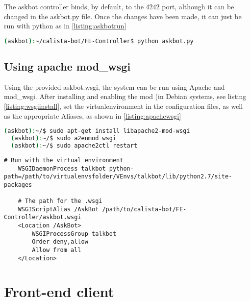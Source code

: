 The askbot controller binds, by default, to the 4242 port, although it can be changed in the askbot.py file. Once the changes have been made, it can just be run with python as in \ref{listing:askbotrun}
\begin{center} 
  \begin{lstlisting}[language=bash, captionpos=b, caption=Running the front end controller, label=listing:askbotrun]
  (askbot):~/calista-bot/FE-Controller$ python askbot.py
  \end{lstlisting}
\end{center}

\subsection{Using apache mod\_wsgi}

Using the provided askbot.wsgi, the system can be run using Apache and mod\_wsgi. After installing and enabling the mod (in Debian systems, see listing \ref{listing:wsgiinstall}, set the virtualenvironment in the configuration files, as well as the appropriate Aliases, as shown in \ref{listing:apachewsgi}
\begin{center} 
  \begin{lstlisting}[language=bash, captionpos=b, caption=Installing mod\_wsgi, label=listing:wsgiinstall]
  (askbot):~/$ sudo apt-get install libapache2-mod-wsgi
  (askbot):~/$ sudo a2enmod wsgi
  (askbot):~/$ sudo apache2ctl restart
  \end{lstlisting}
\end{center}

\begin{center} 
  \begin{lstlisting}[language={}, captionpos=b, caption=Apache WSGI configuration, label=listing:apachewsgi]
    # Run with the virtual environment
    WSGIDaemonProcess talkbot python-path=/path/to/virtualenvsfolder/VEnvs/talkbot/lib/python2.7/site-packages
    
    # The path for the .wsgi
    WSGIScriptAlias /AskBot /path/to/calista-bot/FE-Controller/askbot.wsgi
    <Location /AskBot>
        WSGIProcessGroup talkbot
        Order deny,allow
        Allow from all
    </Location>
  \end{lstlisting}
\end{center}

\section{Front-end client}

